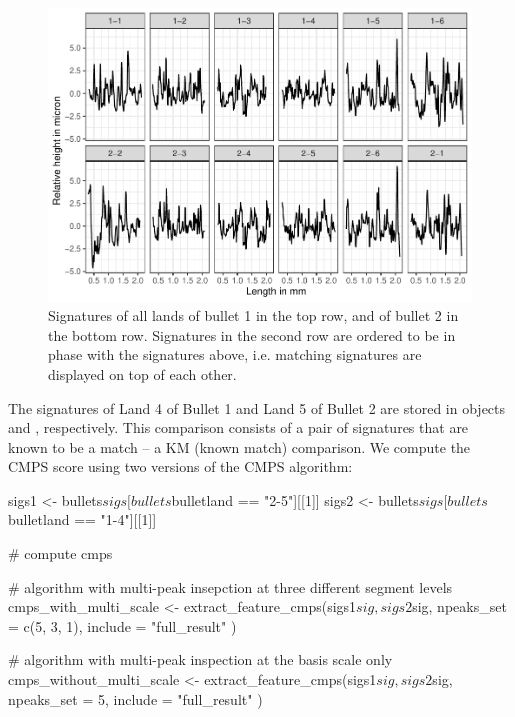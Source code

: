 \begin{Schunk}
\begin{figure}

{\centering \includegraphics[width=\textwidth]{ju-hofmann_files/figure-latex/sigs-1} 

}

\caption[Signatures of all lands of bullet 1 in the top row, and of bullet 2 in the bottom row]{Signatures of all lands of bullet 1 in the top row, and of bullet 2 in the bottom row. Signatures in the second row are ordered to be in phase with the signatures above, i.e. matching signatures are displayed on top of each other.}\label{fig:sigs}
\end{figure}
\end{Schunk}

The signatures of Land 4 of Bullet 1 and Land 5 of Bullet 2 are stored
in objects  and , respectively. This comparison
consists of a pair of signatures that are known to be a match -- a KM
(known match) comparison. We compute the CMPS score using two versions
of the CMPS algorithm:

\begin{Schunk}
\begin{Sinput}
sigs1 <- bullets$sigs[bullets$bulletland == "2-5"][[1]]
sigs2 <- bullets$sigs[bullets$bulletland == "1-4"][[1]]

# compute cmps

# algorithm with multi-peak insepction at three different segment levels
cmps_with_multi_scale <-
  extract_feature_cmps(sigs1$sig, sigs2$sig,
    npeaks_set = c(5, 3, 1), include = "full_result"
  )

# algorithm with multi-peak inspection at the basis scale only
cmps_without_multi_scale <-
  extract_feature_cmps(sigs1$sig, sigs2$sig,
    npeaks_set = 5, include = "full_result"
  )
\end{Sinput}
\end{Schunk}

